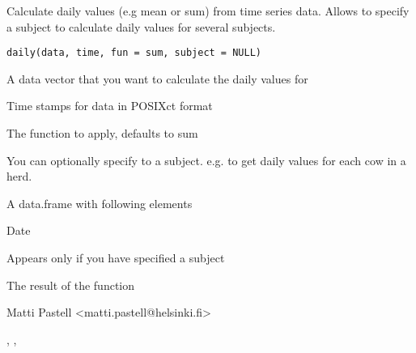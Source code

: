 \begin{Description}\relax
Calculate daily values (e.g mean or sum) from time series data. Allows
to specify a subject to calculate daily values for several subjects.
\end{Description}
\begin{Usage}
\begin{verbatim}
daily(data, time, fun = sum, subject = NULL)
\end{verbatim}
\end{Usage}
\begin{Arguments}
\begin{ldescription}
\item[\code{data}] A data vector that you want to calculate the daily values
for
\item[\code{time}] Time stamps for data in POSIXct format
\item[\code{fun}] The function to apply, defaults to sum
\item[\code{subject}] You can optionally specify to a subject. e.g. to get
daily values for each cow in a herd.
\end{ldescription}
\end{Arguments}
\begin{Value}
A data.frame with following elements
\begin{ldescription}
\item[\code{Day}] Date
\item[\code{Subject}] Appears only if you have specified a subject
\item[\code{Result}] The result of the function
\end{ldescription}
\end{Value}
\begin{Author}\relax
Matti Pastell <matti.pastell@helsinki.fi>
\end{Author}
\begin{SeeAlso}\relax
{}, ,
\end{SeeAlso}
\begin{Examples}
\end{Examples}

